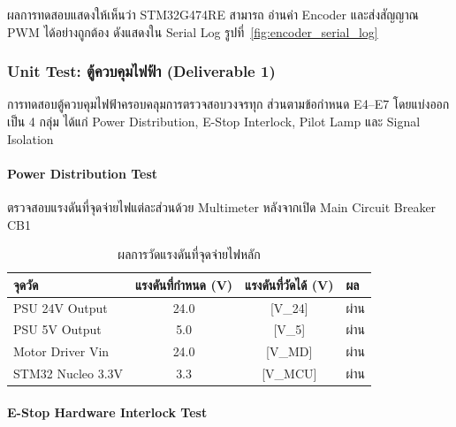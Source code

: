 ผลการทดสอบแสดงให้เห็นว่า STM32G474RE สามารถ
อ่านค่า Encoder และส่งสัญญาณ PWM ได้อย่างถูกต้อง
ดังแสดงใน Serial Log รูปที่~\ref{fig:encoder_serial_log}


\subsubsection{Unit Test: ตู้ควบคุมไฟฟ้า (Deliverable 1)}
\label{subsubsec:unit_test_electrical_cabinet}

การทดสอบตู้ควบคุมไฟฟ้าครอบคลุมการตรวจสอบวงจรทุก
ส่วนตามข้อกำหนด E4--E7 โดยแบ่งออกเป็น 4 กลุ่ม
ได้แก่ Power Distribution, E-Stop Interlock,
Pilot Lamp และ Signal Isolation

\paragraph{Power Distribution Test}

ตรวจสอบแรงดันที่จุดจ่ายไฟแต่ละส่วนด้วย Multimeter
หลังจากเปิด Main Circuit Breaker CB1

\begin{table}[H]
  \centering
  \caption{ผลการวัดแรงดันที่จุดจ่ายไฟหลัก}
  \label{tab:power_test}
  \begin{tabular}{lccl}
    \toprule
    จุดวัด & แรงดันที่กำหนด (V) & แรงดันที่วัดได้ (V) & ผล \\
    \midrule
    PSU 24V Output    & 24.0 & [V\_24]  & ผ่าน \\
    PSU 5V Output     & 5.0  & [V\_5]   & ผ่าน \\
    Motor Driver Vin  & 24.0 & [V\_MD]  & ผ่าน \\
    STM32 Nucleo 3.3V & 3.3  & [V\_MCU] & ผ่าน \\
    \bottomrule
  \end{tabular}
\end{table}

\paragraph{E-Stop Hardware Interlock Test}

